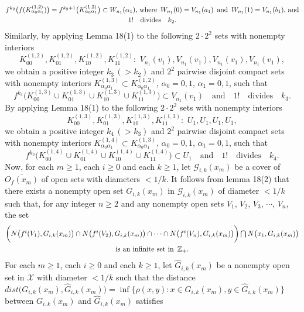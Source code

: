 \documentclass[12pt]{article}
\newcommand{\al}{\alpha}
\begin{document}
\begin{multline*}
$$
f^{k_2}\big(f(K_{\al_0\al_1}^{(1,2)})\big) = f^{k_2+1}\big(K_{\al_0\al_1}^{(1,2)}\big) \subset W_{n_1}(\al_1), \, \text{where} \,\,\, W_{n_1}(0) = V_{n_1}(a_1) \,\,\, \text{and} \,\,\, W_{n_1}(1) = V_{n_1}(b_1), \, \text{and} \\ 
1! \quad \text{divides} \quad k_2.
$$
\end{multline*}
\indent Similarly, by applying Lemma 18(1) to the following $2 \cdot 2^2$ sets with nonempty interiors 
$$
K_{00}^{(1,2)}, K_{01}^{(1,2)}, K_{10}^{(1,2)}, K_{11}^{(1,2)}: \,\, V_{n_1}(v_1), V_{n_1}(v_1), V_{n_1}(v_1), V_{n_1}(v_1),
$$
we obtain a positive integer $k_3 \, (> k_2)$ and $2^2$ pairwise disjoint compact sets with nonempty interiors $K_{\al_0\al_1}^{(1,3)} \subset K_{\al_0\al_1}^{(1,2)}$, $\al_0 = 0, 1$, $\al_1 = 0, 1$, such that 
$$
f^{k_3}\big(K_{00}^{(1,3)} \cup K_{01}^{(1,3)} \cup K_{10}^{(1,3)} \cup K_{11}^{(1,3)}\big) \subset V_{n_1}(v_1) \quad \text{and} \quad 1! \quad \text{divides} \quad k_3.
$$
\indent By applying Lemma 18(1) to the following $2 \cdot 2^2$ sets with nonempty interiors 
$$
K_{00}^{(1,3)}, K_{01}^{(1,3)}, K_{10}^{(1,3)}, K_{11}^{(1,3)}: \,\, U_1, U_1, U_1, U_1,
$$
we obtain a positive integer $k_4 \, (> k_3)$ and $2^2$ pairwise disjoint compact sets with nonempty interiors $K_{\al_0\al_1}^{(1,4)} \subset K_{\al_0\al_1}^{(1,3)}$, $\al_0 = 0, 1$, $\al_1 = 0, 1$, such that 
$$
f^{k_3}\big(K_{00}^{(1,4)} \cup K_{01}^{(1,4)} \cup K_{10}^{(1,4)} \cup K_{11}^{(1,4)}\big) \subset U_1 \quad \text{and} \quad 1! \quad \text{divides} \quad k_4.
$$
\indent Now, for each $m \ge 1$, each $i \ge 0$ and each $k \ge 1$, let $\mathcal G_{i,k}(x_m)$ be a cover of $\overline{O_f(x_m)}$ of open sets with diameters $< 1/k$.  It follows from lemma 18(2) that there exists a nonempty open set $G_{i,k}(x_m)$ in $\mathcal G_{i,k}(x_m)$ of diameter $< 1/k$ such that, for any integer $n \ge 2$ and any nonempty open sets $V_1$, $V_2$, $V_3$, $\cdots$, $V_n$, the set  
\begin{multline*}
$$
\bigg(N\big(f^i(V_1), G_{i,k}(x_m)\big) \cap N\big(f^i(V_2), G_{i,k}(x_m)\big) \cap \cdots \cap N\big(f^i(V_n), G_{i,k}(x_m)\big)\bigg) \bigcap N\big(x_1, G_{i,k}(x_m)\big) \\
\text{is an infinite set in} \,\,\, \mathbb Z_+. 
$$
\end{multline*}
\indent For each $m \ge 1$, each $i \ge 0$ and each $k \ge 1$, let $\widehat G_{i,k}(x_m)$ be a nonempty open set in $\mathcal X$ with diameter $< 1/k$ such that the distance $dist\big(G_{i,k}(x_m), \widehat G_{i,k}(x_m)\big) = \inf\big\{ \rho(x, y): x \in G_{i,k}(x_m), y \in \widehat G_{i,k}(x_m) \big\}$ between $G_{i,k}(x_m)$ and $\widehat G_{i,k}(x_m)$ satisfies 
\end{document}
